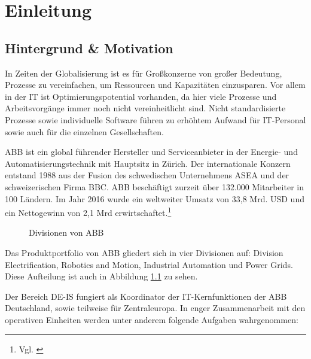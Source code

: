 \chapter{Einleitung}

\section{Hintergrund \& Motivation}

In Zeiten der Globalisierung ist es für Großkonzerne von großer Bedeutung, Prozesse zu vereinfachen, um Ressourcen und Kapazitäten einzusparen. Vor allem in der \ac{IT} ist Optimierungspotential vorhanden, da hier viele Prozesse und Arbeitsvorgänge immer noch nicht vereinheitlicht sind.
Nicht standardisierte Prozesse sowie individuelle Software führen zu erhöhtem Aufwand für IT-Personal sowie auch für die einzelnen Gesellschaften.

ABB ist ein global f\"{u}hrender Hersteller und Serviceanbieter in der Energie- und Automatisierungstechnik mit Hauptsitz in Z\"{u}rich.
Der internationale Konzern entstand 1988 aus der Fusion des schwedischen Unternehmens \ac{ASEA} und der schweizerischen Firma \ac{BBC}. ABB besch\"{a}ftigt zurzeit \"{u}ber 132.000 Mitarbeiter in 100 L\"{a}ndern. Im Jahr 2016 wurde ein weltweiter Umsatz von 33,8 Mrd. USD und ein Nettogewinn von 2,1 Mrd erwirtschaftet.\footnote{Vgl. \cite{ABB.2017}} 
\linebreak



\begin{figure}[ht]
	\centering
	
	\caption{Divisionen von ABB}
	\label{fig1}
	
\end{figure}

Das Produktportfolio von ABB gliedert sich in vier Divisionen auf: Division Electrification, Robotics and Motion, Industrial Automation und Power Grids. Diese Aufteilung ist auch in Abbildung \ref{fig1} zu sehen.

Der Bereich \ac{DE-IS} fungiert als Koordinator der IT-Kernfunktionen der ABB Deutschland, sowie teilweise für Zentraleuropa. In enger Zusammenarbeit mit den operativen Einheiten werden unter anderem folgende Aufgaben wahrgenommen:

